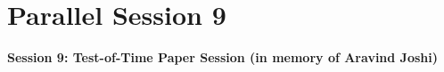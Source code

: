 \clearpage

\newpage
\section*{Parallel Session 9}
{\bfseries\large Session 9: Test-of-Time Paper Session (in memory of Aravind Joshi)}\\
\TrackALoc\hfill{}
\clearpage


